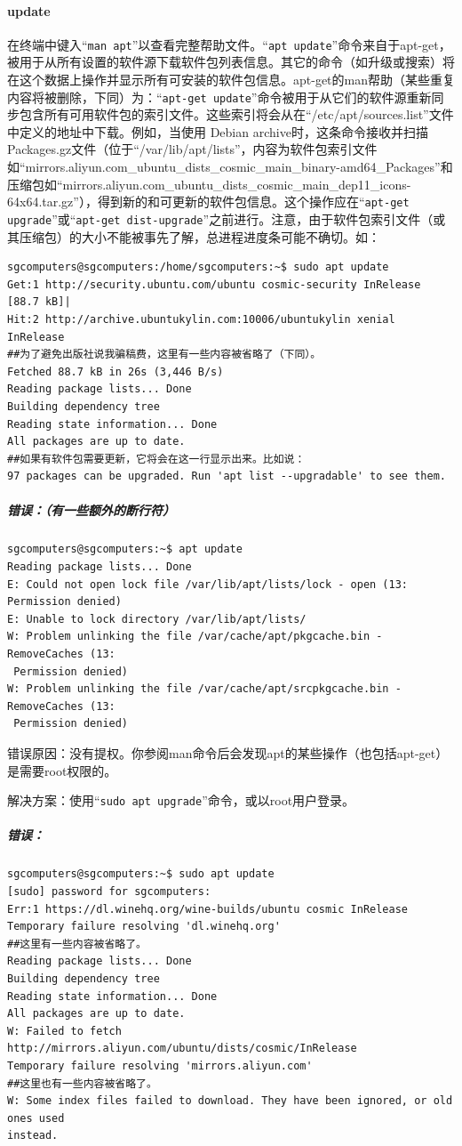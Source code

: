 \paragraph{update} 
在终端中键入“\verb|man apt|”以查看完整帮助文件。“\verb|apt update|”命令来自于apt-get，被用于从所有设置的软件源下载软件包列表信息。其它的命令（如升级或搜索）将在这个数据上操作并显示所有可安装的软件包信息。apt-get的man帮助（某些重复内容将被删除，下同）为：“\verb|apt-get update|”命令被用于从它们的软件源重新同步包含所有可用软件包的索引文件。这些索引将会从在“/etc/apt/sources.list”文件中定义的地址中下载。例如，当使用 Debian archive时，这条命令接收并扫描Packages.gz文件（位于“/var/lib/apt/lists”，内容为软件包索引文件如“mirrors.aliyun.com\_ubuntu\_dists\_cosmic\_main\_binary-amd64\_Packages”和压缩包如“mirrors.aliyun.com\_ubuntu\_dists\_cosmic\_main\_dep11\_icons-64x64.tar.gz”），得到新的和可更新的软件包信息。这个操作应在“\verb|apt-get upgrade|”或“\verb|apt-get dist-upgrade|”之前进行。注意，由于软件包索引文件（或其压缩包）的大小不能被事先了解，总进程进度条可能不确切。如：
\begin{verbatim}
sgcomputers@sgcomputers:/home/sgcomputers:~$ sudo apt update
Get:1 http://security.ubuntu.com/ubuntu cosmic-security InRelease [88.7 kB]|
Hit:2 http://archive.ubuntukylin.com:10006/ubuntukylin xenial InRelease
##为了避免出版社说我骗稿费，这里有一些内容被省略了（下同）。
Fetched 88.7 kB in 26s (3,446 B/s)
Reading package lists... Done
Building dependency tree
Reading state information... Done
All packages are up to date.
##如果有软件包需要更新，它将会在这一行显示出来。比如说：
97 packages can be upgraded. Run 'apt list --upgradable' to see them.
\end{verbatim}
\subparagraph{错误：（有一些额外的断行符）}
\begin{verbatim}
sgcomputers@sgcomputers:~$ apt update
Reading package lists... Done
E: Could not open lock file /var/lib/apt/lists/lock - open (13: Permission denied)
E: Unable to lock directory /var/lib/apt/lists/
W: Problem unlinking the file /var/cache/apt/pkgcache.bin - RemoveCaches (13:
 Permission denied)
W: Problem unlinking the file /var/cache/apt/srcpkgcache.bin - RemoveCaches (13:
 Permission denied)
\end{verbatim} \par
错误原因：没有提权。你参阅man命令后会发现apt的某些操作（也包括apt-get）是需要root权限的。  \par
解决方案：使用“\verb|sudo apt upgrade|”命令，或以root用户登录。  \par
\subparagraph{错误：}
\begin{verbatim}
sgcomputers@sgcomputers:~$ sudo apt update
[sudo] password for sgcomputers:
Err:1 https://dl.winehq.org/wine-builds/ubuntu cosmic InRelease
Temporary failure resolving 'dl.winehq.org'
##这里有一些内容被省略了。
Reading package lists... Done
Building dependency tree
Reading state information... Done
All packages are up to date.
W: Failed to fetch http://mirrors.aliyun.com/ubuntu/dists/cosmic/InRelease
Temporary failure resolving 'mirrors.aliyun.com'
##这里也有一些内容被省略了。
W: Some index files failed to download. They have been ignored, or old ones used
instead.
\end{verbatim} \par

